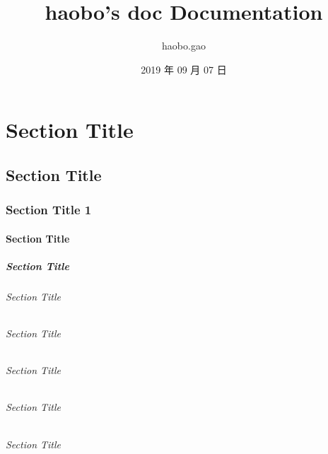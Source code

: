\documentclass[letterpaper,10pt,english]{sphinxmanual}
\title{haobo's doc Documentation}
\date{2019 年 09 月 07 日}
\author{haobo.gao}
\begin{document}
\maketitle
\sphinxtableofcontents
{}\label{\detokenize{index::doc}}



\chapter{Section Title}
\label{\detokenize{intro:section-title}}\label{\detokenize{intro::doc}}

\section{Section Title}
\label{\detokenize{intro:id1}}

\subsection{Section Title 1}
\label{\detokenize{intro:section-title-1}}

\subsubsection{Section Title}
\label{\detokenize{intro:id2}}

\paragraph{Section Title}
\label{\detokenize{intro:id3}}

\subparagraph{Section Title}
\label{\detokenize{intro:id4}}

\subparagraph{Section Title}
\label{\detokenize{intro:id5}}

\subparagraph{Section Title}
\label{\detokenize{intro:id6}}

\subparagraph{Section Title}
\label{\detokenize{intro:id7}}

\subparagraph{Section Title}
\label{\detokenize{intro:id8}}
\end{document}
